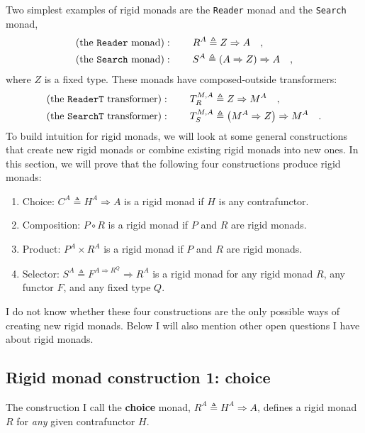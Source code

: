 Two simplest examples of rigid monads are the \lstinline!Reader!
monad and the \lstinline!Search!
monad, 
\begin{align*}
\text{(the \texttt{Reader} monad)} & :\quad\quad R^{A}\triangleq Z\Rightarrow A\quad,\\
\text{(the \texttt{Search} monad)} & :\quad\quad S^{A}\triangleq\left(A\Rightarrow Z\right)\Rightarrow A\quad,
\end{align*}
where $Z$ is a fixed type. These monads have composed-outside transformers:
\begin{align*}
\text{(the \texttt{ReaderT} transformer)} & :\quad\quad T_{R}^{M,A}\triangleq Z\Rightarrow M^{A}\quad,\\
\text{(the \texttt{SearchT} transformer)} & :\quad\quad T_{S}^{M,A}\triangleq\left(M^{A}\Rightarrow Z\right)\Rightarrow M^{A}\quad.
\end{align*}
To build intuition for rigid monads, we will look at some general
constructions that create new rigid monads or combine existing rigid
monads into new ones. In this section, we will prove that the following
four constructions produce rigid monads:
\begin{enumerate}
\item Choice: $C^{A}\triangleq H^{A}\Rightarrow A$ is a rigid monad if
$H$ is any contrafunctor.
\item Composition: $P\circ R$ is a rigid monad if $P$ and $R$ are rigid
monads.
\item Product: $P^{A}\times R^{A}$ is a rigid monad if $P$ and $R$ are
rigid monads.
\item Selector: $S^{A}\triangleq F^{A\Rightarrow R^{Q}}\Rightarrow R^{A}$
is a rigid monad for any rigid monad $R$, any functor $F$, and any
fixed type $Q$.
\end{enumerate}
I do not know whether these four constructions are the only possible
ways of creating new rigid monads. Below I will also mention other
open questions I have about rigid monads.

\subsection{Rigid monad construction 1: choice\label{subsec:Rigid-monad-construction-1-choice}}

The construction I call the \textbf{choice}
monad, $R^{A}\triangleq H^{A}\Rightarrow A$, defines a rigid monad
$R$ for \emph{any} given contrafunctor $H$. 

